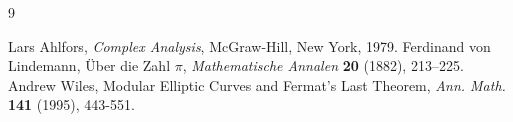 \begin{thebibliography}{9}

	Lars Ahlfors,
	\emph{Complex Analysis},
	McGraw-Hill, New York, 1979.
	Ferdinand von Lindemann,
	\"{U}ber die Zahl $\pi$,
	\emph{Mathematische Annalen} \textbf{20} (1882), 213--225.
	Andrew Wiles,
	Modular Elliptic Curves and Fermat's Last Theorem,
	\emph{Ann. Math.} \textbf{141} (1995), 443-551.
\end{thebibliography}



